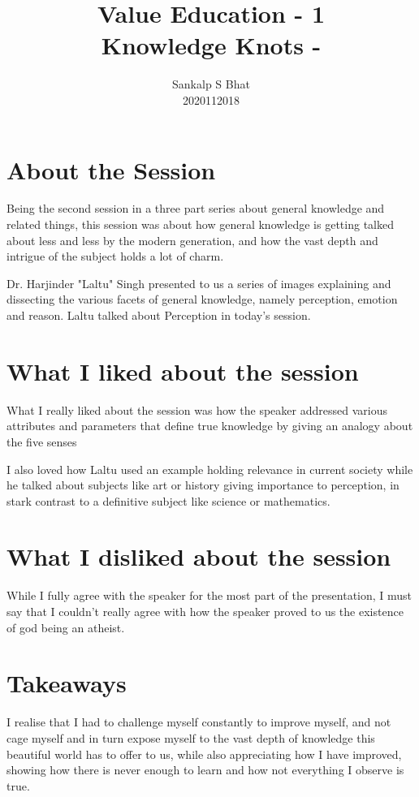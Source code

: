 \documentclass[a4paper, 12pt]{extarticle}
\title{Value Education - 1\\
Knowledge Knots - \uppercase\expandafter{\romannumeral2\relax}}
\author{Sankalp S Bhat\\
2020112018
}
\begin{document}
\maketitle
\thispagestyle{empty}

\section*{About the Session}
Being the second session in a three part series about general knowledge and related things, this session was about how general knowledge is getting talked about less and less by the modern generation, and how the vast depth and intrigue of the subject holds a lot of charm.

Dr. Harjinder "Laltu" Singh presented to us a series of images explaining and dissecting the various facets of general knowledge, namely perception, emotion and reason. Laltu talked about Perception in today's session.
      
\section*{What I liked about the session}

What I really liked about the session was how the speaker addressed various attributes and parameters that define true knowledge by giving an analogy about the five senses
    
I also loved how Laltu used an example holding relevance in current society while he talked about subjects like art or history giving importance to perception, in stark contrast to a definitive subject like science or mathematics.


 \section*{What I disliked about the session}
 
While I fully agree with the speaker for the most part of the presentation, I must say that I couldn't really agree with how the speaker proved to us the existence of god being an atheist.

\section*{Takeaways}
    
I realise that I had to challenge myself constantly to improve myself, and not cage myself and in turn expose myself to the vast depth of knowledge this beautiful world has to offer to us, while also appreciating how I have improved, showing how there is never enough to learn and how not everything I observe is true.
\end{document}
